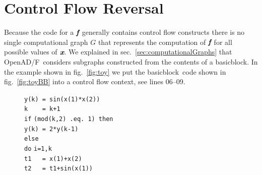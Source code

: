 \documentclass{book}
\newcommand{\basicblock}{basicblock}
\newcommand{\OpenADF}{OpenAD/F}
\newcommand{\bmf}{\mbox{\bf\em f}}
\newcommand{\bmx}{\mbox{\bf\em x}}
\newcommand{\refsec}[1]{{sec.~\ref{#1}}}
\newcommand{\reffig}[1]{{fig.~\ref{#1}}}
\begin{document}
\section{Control Flow Reversal} \label{sec:cfReversal}
Because the code for a $\bmf$ generally contains control flow constructs there is no 
single  computational graph 
$G$ that represents the computation of $\bmf$ for all possible values of $\bmx$.
We explained in \refsec{sec:computationalGraphs} that \OpenADF\ considers subgraphs constructed 
from the contents of a \basicblock.
In the example shown in \reffig{fig:toy} we put the \basicblock\ code shown in 
\reffig{fig:toyBB} into a control flow context, see lines 06--09.
\begin{figure}
  \begin{center}
    \begin{minipage}{.5\textwidth}
      \begin{tabbing}
        \hspace{.6cm}{\footnotesize \bf 00}\hspace{.5cm} \lstinline{y(k) = sin(x(1)*x(2))} \\
        \hspace{.6cm}{\footnotesize \bf 01}\hspace{.5cm} \lstinline{k    = k+1} \\
        \hspace{.6cm}{\footnotesize \bf 02}\hspace{.5cm} \lstinline{if} \=\lstinline{(mod(k,2) .eq. 1) then } \\
        \hspace{.6cm}{\footnotesize \bf 03}\hspace{.5cm} \>\lstinline{y(k) = 2*y(k-1)}  \\
        \hspace{.6cm}{\footnotesize \bf 04}\hspace{.5cm} \lstinline{else } \\
        \hspace{.6cm}{\footnotesize \bf 05}\hspace{.5cm} \>\lstinline{do} \=\lstinline{i=1,k } \\
        \hspace{.6cm}{\footnotesize \bf 06}\hspace{.5cm} \>\>\lstinline{t1   = x(1)+x(2) } \\
        \hspace{.6cm}{\footnotesize \bf 07}\hspace{.5cm} \>\>\lstinline{t2   = t1+sin(x(1)) } \\

\end{tabbing}
\end{minipage}
\end{center}
\end{figure}
\end{document}
